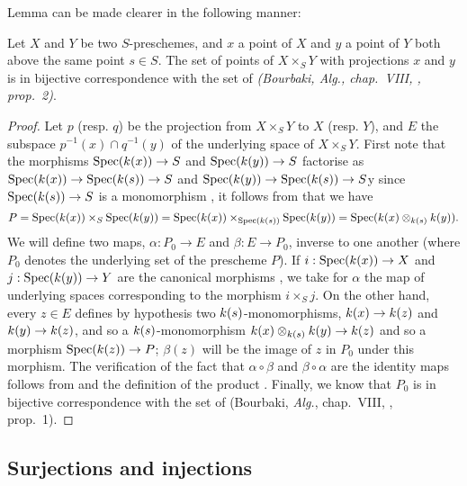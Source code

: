 Lemma  can be made clearer in the following manner:
\begin{prop}[3.4.9]
\label{1.3.4.9}
Let $X$ and $Y$ be two $S$-preschemes, and $x$ a point of $X$ and $y$ a point of $Y$ both above the same point $s\in S$.
The set of points of $X\times_S Y$ with projections $x$ and $y$ is in bijective correspondence with the set of  \emph{(Bourbaki, \emph{Alg.}, chap.~VIII, , prop.~2)}.
\end{prop}

\begin{proof}
\label{proof-1.3.4.9}
Let $p$ (resp. $q$) be the projection from $X\times_S Y$ to $X$ (resp. $Y$), and $E$ the subspace $p^{-1}(x)\cap q^{-1}(y)$ of the underlying space of $X\times_S Y$.
First note that the morphisms $\Spec(\kres(x))\to S$ and $\Spec(\kres(y))\to S$ factorise as $\Spec(\kres(x))\to\Spec(\kres(s))\to S$ and $\Spec(\kres(y))\to\Spec(\kres(s))\to S$y since $\Spec(\kres(s))\to S$ is a monomorphism , it follows from  that we have
\[
  P={\mathop{\mathrm{Spec}}\nolimits}(k(x))\times_S{\mathop{\mathrm{Spec}}\nolimits}(k(y))={\mathop{\mathrm{Spec}}\nolimits}(k(x))\times_{{\mathop{\mathrm{Spec}}\nolimits}(k(s))}{\mathop{\mathrm{Spec}}\nolimits}(k(y))={\mathop{\mathrm{Spec}}\nolimits}(k(x)\otimes_{k(s)}k(y)).
\]
We will define two maps, $\alpha:P_0\to E$ and $\beta:E\to P_0$, inverse to one another (where $P_0$ denotes the underlying set of the prescheme $P$).
If $i:\Spec(\kres(x))\to X$ and $j:\Spec(\kres(y))\to Y$ are the canonical morphisms , we take for $\alpha$ the map of underlying spaces corresponding to the morphism $i\times_S j$.
On the other hand, every $z\in E$ defines by hypothesis two $k(s)$-monomorphisms, $\kres(x)\to\kres(z)$ and $\kres(y)\to\kres(z)$, and so a $k(s)$-monomorphism $\kres(x)\otimes_{\kres(s)}\kres(y)\to\kres(z)$ and so a morphism $\Spec(\kres(z))\to P$; $\beta(z)$ will be the image of $z$ in $P_0$ under this morphism.
The verification of the fact that $\alpha\circ\beta$ and $\beta\circ\alpha$ are the identity maps follows from  and the definition of the product .
Finally, we know that $P_0$ is in bijective correspondence with the set of  (Bourbaki, \emph{Alg.}, chap.~VIII, , prop.~1).
\end{proof}

\subsection{Surjections and injections}
\label{subsection-surjections-and-injections}

